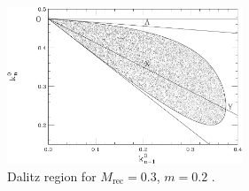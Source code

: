 \documentclass[11pt,a4paper]{article}
\newcommand{\tmop}[1]{\ensuremath{\operatorname{#1}}}
\begin{document}
\begin{figure}[h]
\begin{center}
  \includegraphics[width=0.625\textwidth]{Fig7}
  \caption{Dalitz region for $M_{\tmop{rec}} = 0.3$, $m = 0.2$ .}
   \label{dalitz}
\end{center}
\end{figure}
\end{document}
